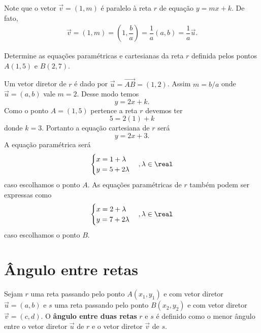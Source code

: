 Note que o vetor $\vec{v} = (1,m)$ é paralelo à reta $r$ de equação $y = mx + k$. De fato,
\begin{align*}
  \vec{v} = (1,m) = \left(1, \dfrac{b}{a}\right) = \dfrac{1}{a}(a,b) = \dfrac{1}{a}\vec{u}.
\end{align*}

\begin{exemplos}
  Determine as equações paramétricas e cartesianas da reta $r$ definida pelos pontos $A(1,5)$ e $B(2,7)$.
  \begin{solucao}
    Um vetor diretor de $r$ é dado por $\vec{u} = \vec{AB} = (1,2)$. Assim $m = b/a$ onde $\vec{u} = (a,b)$ vale $m = 2$. Desse modo temos
    \[
      y = 2x + k.
    \]
    Como o ponto $A = (1,5)$ pertence a reta $r$ devemos ter
    \[
      5 = 2(1) + k
    \]
    donde $k = 3$. Portanto a equação cartesiana de $r$ será
    \[
      y = 2x + 3.
    \]
    A equação paramétrica será
    \[
      \begin{cases}
        x = 1 + \lambda\\
        y = 5 + 2\lambda
      \end{cases}, \lambda \in \real
    \]
    caso escolhamos o ponto $A$. As equações paramétricas de $r$ também podem ser expressas como
    \[
      \begin{cases}
        x = 2 + \lambda\\
        y = 7 + 2\lambda
      \end{cases}, \lambda \in \real
    \]
    caso escolhamos o ponto $B$.
  \end{solucao}
\end{exemplos}

\section{\^Angulo entre retas} %
\label{sec:angulo_entre_retas}
Sejam $r$ uma reta passando pelo ponto $A(x_1, y_1)$ e com vetor diretor $\vec{u} = (a,b)$ e $s$ uma reta passando pelo ponto $B(x_2, y_2)$ e com vetor diretor $\vec{v} = (c,d)$. O \textbf{\^angulo entre duas retas} $r$ e $s$ é definido como o menor \^angulo entre o vetor diretor $\vec{u}$ de $r$ e o vetor diretor $\vec{v}$ de $s$.

